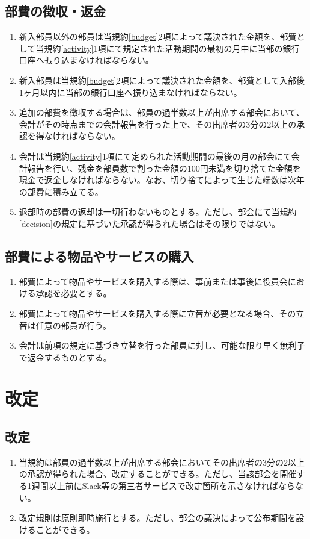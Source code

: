 \documentclass[12pt, unicode, a4paper]{ltjsreport}
\begin{document}
    \section{部費の徴収・返金}
        \begin{enumerate}
            \item 新入部員以外の部員は当規約\ref{budget}2項によって議決された金額を、部費として当規約\ref{activity}1項にて規定された活動期間の最初の月中に当部の銀行口座へ振り込まなければならない。
            \item 新入部員は当規約\ref{budget}2項によって議決された金額を、部費として入部後1ヶ月以内に当部の銀行口座へ振り込まなければならない。
            \item 追加の部費を徴収する場合は、部員の過半数以上が出席する部会において、会計がその時点までの会計報告を行った上で、その出席者の3分の2以上の承認を得なければならない。
            \item 会計は当規約\ref{activity}1項にて定められた活動期間の最後の月の部会にて会計報告を行い、残金を部員数で割った金額の100円未満を切り捨てた金額を現金で返金しなければならない。なお、切り捨てによって生じた端数は次年の部費に積み立てる。
            \item 退部時の部費の返却は一切行わないものとする。ただし、部会にて当規約\ref{decision}の規定に基づいた承認が得られた場合はその限りではない。
        \end{enumerate}

    \section{部費による物品やサービスの購入}
        \begin{enumerate}
            \item 部費によって物品やサービスを購入する際は、事前または事後に役員会における承認を必要とする。
            \item 部費によって物品やサービスを購入する際に立替が必要となる場合、その立替は任意の部員が行う。
            \item 会計は前項の規定に基づき立替を行った部員に対し、可能な限り早く無利子で返金するものとする。
        \end{enumerate}


\chapter{改定}
    \section{改定}
        \begin{enumerate}
            \item 当規約は部員の過半数以上が出席する部会においてその出席者の3分の2以上の承認が得られた場合、改定することができる。ただし、当該部会を開催する1週間以上前にSlack等の第三者サービスで改定箇所を示さなければならない。
            \item 改定規則は原則即時施行とする。ただし、部会の議決によって公布期間を設けることができる。
        \end{enumerate}
\end{document}
